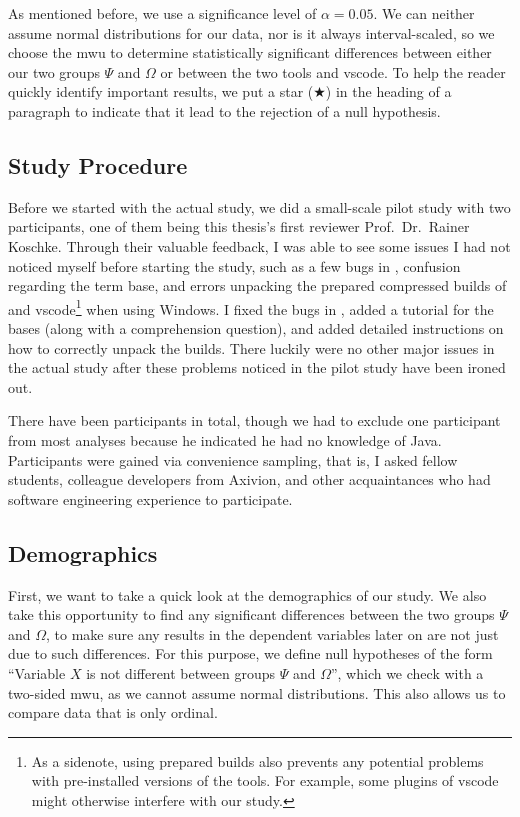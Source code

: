 \documentclass[../thesis]{subfiles}
\begin{document}
As mentioned before, we use a significance level of $\alpha = 0.05$.
We can neither assume normal distributions for our data, nor is it always interval-scaled, so we choose the \gls{mwu} to determine statistically significant differences between either our two groups $\Psi$ and $\Omega$ or between the two tools \SEE{} and \gls{vscode}.
To help the reader quickly identify important results, we put a star ($\bigstar$) in the heading of a paragraph to indicate that it lead to the rejection of a null hypothesis.

\subsection{Study Procedure}\label{subsec:procedure}
Before we started with the actual study, we did a small-scale pilot study with two participants, one of them being this thesis's first reviewer Prof.\ Dr.\ Rainer Koschke.
Through their valuable feedback, I was able to see some issues I had not noticed myself before starting the study, such as a few bugs in \SEE{}, confusion regarding the term \gls{base}, and errors unpacking the prepared compressed builds of \SEE{} and \gls{vscode}\footnote{
	As a sidenote, using prepared builds also prevents any potential problems with pre-installed versions of the tools.
	For example, some plugins of \gls{vscode} might otherwise interfere with our study.
} when using Windows.
I fixed the bugs in \SEE{}, added a tutorial for the \glspl{base} (along with a comprehension question), and added detailed instructions on how to correctly unpack the builds.
There luckily were no other major issues in the actual study after these problems noticed in the pilot study have been ironed out.

There have been \participants participants in total, though we had to exclude one participant from most analyses because he indicated he had no knowledge of Java.
Participants were gained via convenience sampling, that is, I asked fellow students, colleague developers from Axivion, and other acquaintances who had software engineering experience to participate.

\subsection{Demographics}\label{subsec:demographics}

First, we want to take a quick look at the demographics of our study.
We also take this opportunity to find any significant differences between the two groups $\Psi$ and $\Omega$, to make sure any results in the dependent variables later on are not just due to such differences.
For this purpose, we define null hypotheses of the form \enquote{Variable $X$ is not different between groups $\Psi$ and $\Omega$}, which we check with a two-sided \gls{mwu}, as we cannot assume normal distributions.
This also allows us to compare data that is only ordinal.
\end{document}
